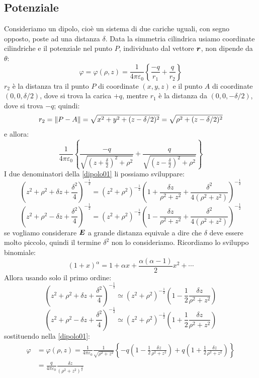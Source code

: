 \subsection{Potenziale}
Consideriamo un dipolo, cioè un sistema di due cariche uguali, con segno opposto, poste ad una distanza $\delta$. Data la simmetria cilindrica usiamo coordinate cilindriche e il potenziale nel punto $P$, individuato dal vettore $\boldsymbol{r}$, non dipende da $\theta$:
\begin{equation}
  \varphi=\varphi(\rho,z)=\frac{1}{4\pi\varepsilon_0}\left\{\frac{-q}{r_1}+\frac{q}{r_2}\right\}
\end{equation}
$r_2$ è la distanza tra il punto $P$ di coordinate $(x,y,z)$ e il punto $A$ di coordinate $(0,0,\delta/2)$, dove si trova la carica $+q$, mentre $r_1$ è la distanza da $(0,0,-\delta/2)$, dove si trova $-q$; quindi:
\[
  r_2 = \left\lVert P-A\right\rVert = \sqrt{x^2+y^2+(z-\delta/2)^2}=\sqrt{\rho^2+(z-\delta/2)^2}
\]
e allora:
\begin{equation}
  \frac{1}{4\pi\varepsilon_0}\left\{\frac{-q}{\sqrt{\left(z+\frac{\delta}{2}\right)^2+\rho^2}}+\frac{q}{\sqrt{\left(z-\frac{\delta}{2}\right)^2+\rho^2}}\right\}
  \label{dipolo01}
\end{equation}
I due denominatori della \eqref{dipolo01} li possiamo sviluppare:
\[\left(z^2+\rho^2+\delta z+\frac{\delta^2}{4}\right)^{-\frac{1}{2}}=\left(z^2+\rho^2\right)^{-\frac{1}{2}}\left(1+\frac{\delta z}{\rho^2+z^2}+\frac{\delta^2}{4\left(\rho^2+z^2\right)}\right)^{-\frac{1}{2}}\]
\[\left(z^2+\rho^2-\delta z+\frac{\delta ^2}{4}\right)^{-\frac{1}{2}}=\left(z^2+\rho^2\right)^{-\frac{1}{2}}\left(1-\frac{\delta z}{\rho^2+z^2}+\frac{\delta^2}{4\left(\rho^2+z^2\right)}\right)^{-\frac{1}{2}}\]
se vogliamo considerare $\boldsymbol{E}$ a grande distanza equivale a dire che $\delta$ deve essere molto piccolo, quindi il termine $\delta^2$ non lo consideriamo. Ricordiamo lo sviluppo binomiale:
\[\left(1+x\right)^\alpha=1+\alpha x+\frac{\alpha\left(\alpha-1\right)}{2}x^2+\cdots\]
Allora usando solo il primo ordine:
\[\left(z^2+\rho^2+\delta z+\frac{\delta^2}{4}\right)^{-\frac{1}{2}}\simeq\left(z^2+\rho^2\right)^{-\frac{1}{2}}\left(1-\frac{1}{2}\frac{\delta z}{\rho^2+z^2}\right)\]
\[\left(z^2+\rho^2-\delta z+\frac{\delta^2}{4}\right)^{-\frac{1}{2}}\simeq\left(z^2+\rho^2\right)^{-\frac{1}{2}}\left(1+\frac{1}{2}\frac{\delta z}{\rho^2+z^2}\right)\]
sostituendo nella \eqref{dipolo01}:
\begin{align*}
  \varphi & =\varphi(\rho,z)=\frac{1}{4\pi\varepsilon_0}\frac{1}{\sqrt{\rho^2+z^2}}\left\{-q\left(1-\frac{1}{2}\frac{\delta z}{\rho^2+z^2}\right)+q\left(1+\frac{1}{2}\frac{\delta z}{\rho^2+z^2}\right)\right\} \\
          & =\frac{q}{4\pi\varepsilon_0}\frac{\delta z}{\left(\rho^2+z^2\right)^\frac{3}{2}}
\end{align*}

